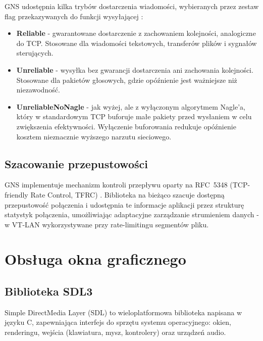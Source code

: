 GNS udostępnia kilka trybów dostarczenia wiadomości, wybieranych przez
zestaw flag przekazywanych do funkcji wysyłającej \cite{GNS}:

\begin{itemize}
	\item \textbf{Reliable} - gwarantowane dostarczenie z zachowaniem
	kolejności, analogiczne do TCP. Stosowane dla wiadomości tekstowych,
	transferów plików i sygnałów sterujących.
	\item \textbf{Unreliable} - wysyłka bez gwarancji dostarczenia ani
	zachowania kolejności. Stosowane dla pakietów głosowych, gdzie
	opóźnienie jest ważniejsze niż niezawodność.
	\item \textbf{UnreliableNoNagle} - jak wyżej, ale z wyłączonym
	algorytmem Nagle'a, który w standardowym TCP buforuje małe pakiety
	przed wysłaniem w celu zwiększenia efektywności. Wyłączenie buforowania
	redukuje opóźnienie kosztem nieznacznie wyższego narzutu sieciowego.
\end{itemize}

\subsection*{Szacowanie przepustowości}

GNS implementuje mechanizm kontroli przepływu oparty na RFC~5348
(TCP-friendly Rate Control, TFRC) \cite{GNS}. Biblioteka na bieżąco
szacuje dostępną przepustowość połączenia i udostępnia te informacje
aplikacji przez strukturę statystyk połączenia, umożliwiając adaptacyjne
zarządzanie strumieniem danych - w VT-LAN wykorzystywane przy
rate-limitingu segmentów pliku.

\section{Obsługa okna graficznego}
\label{sec:sdl}

\subsection*{Biblioteka SDL3}

Simple DirectMedia Layer (SDL) \cite{SDL3} to wieloplatformowa biblioteka
napisana w języku C, zapewniająca interfejs do sprzętu systemu
operacyjnego: okien, renderingu, wejścia (klawiatura, mysz, kontrolery)
oraz urządzeń audio.

